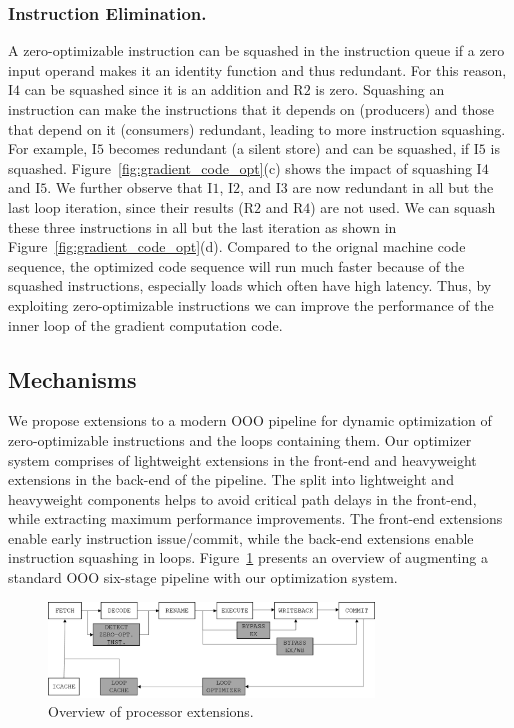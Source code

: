 \subsubsection{Instruction Elimination.} A zero-optimizable instruction can be squashed in the instruction queue if a zero input operand makes it an identity function and thus redundant. For this reason, I$4$ can be squashed since it is an addition and R$2$ is zero. Squashing an instruction can make the  instructions that it depends on (producers) and those that depend on it (consumers) redundant, leading to more instruction squashing.  For example, I$5$ becomes redundant (a silent store) and can be squashed, if I$5$ is squashed. Figure~\ref{fig:gradient_code_opt}(c) shows the impact of squashing I$4$ and I$5$.  We further observe that  I$1$, I$2$, and I$3$ are now redundant in all but the last loop iteration, since their results (R$2$ and R$4$) are not used.  We can squash these three instructions in all but the last iteration as shown in Figure~\ref{fig:gradient_code_opt}(d). Compared to the orignal machine code sequence, the optimized code sequence will run much faster because of the squashed instructions, especially loads which often have high latency.  Thus, by exploiting zero-optimizable instructions we can improve the performance of the inner loop of the gradient computation code. 

\subsection{Mechanisms}

We propose extensions to a modern OOO pipeline for dynamic optimization of zero-optimizable instructions and the loops containing them.  Our optimizer system comprises of lightweight extensions in the front-end and heavyweight extensions in the back-end of the pipeline.  The split into lightweight and heavyweight components helps to avoid critical path delays in the front-end, while extracting maximum performance improvements.  The front-end extensions enable early instruction issue/commit, while the back-end extensions enable instruction squashing in loops.  Figure~\ref{fig:opt_pipeline} presents an overview of augmenting a standard OOO six-stage pipeline with our optimization system.

\begin{figure}
\centering
\includegraphics[height=1in]{Figures/pipeline.png}
\caption{Overview of processor extensions.}
\label{fig:opt_pipeline}
\end{figure}

